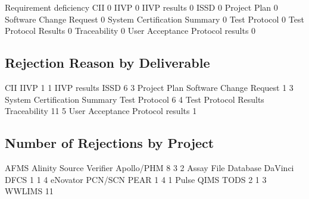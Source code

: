 \documentclass{article}
\begin{document}
\begin{Schunk}
\begin{Soutput}
                                   Requirement deficiency
  CII                                                   0
  IIVP                                                  0
  IIVP results                                          0
  ISSD                                                  0
  Project Plan                                          0
  Software Change Request                               0
  System Certification Summary                          0
  Test Protocol                                         0
  Test Protocol Results                                 0
  Traceability                                          0
  User Acceptance Protocol results                      0
\end{Soutput}
\end{Schunk}


\subsection{Rejection Reason by Deliverable}

\begin{Schunk}
\begin{Soutput}
                             CII                             IIVP 
                               1                                1 
                    IIVP results                             ISSD 
                               6                                3 
                    Project Plan          Software Change Request 
                               1                                3 
    System Certification Summary                    Test Protocol 
                               6                                4 
           Test Protocol Results                     Traceability 
                              11                                5 
User Acceptance Protocol results 
                               1 
\end{Soutput}
\end{Schunk}

\subsection{Number of Rejections by Project}

\begin{Schunk}
\begin{Soutput}
                   AFMS Alinity Source Verifier              Apollo/PHM 
                      8                       3                       2 
    Assay File Database                 DaVinci                    DFCS 
                      1                       1                       4 
               eNovator                 PCN/SCN                    PEAR 
                      1                       4                       1 
                  Pulse                    QIMS                    TODS 
                      2                       1                       3 
                 WWLIMS 
                     11 
\end{Soutput}
\end{Schunk}
\end{document}
